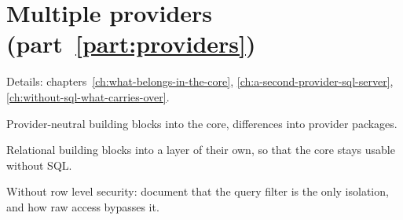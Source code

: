 \section{Multiple providers (part~\ref{part:providers})}

\noindent Details: chapters~\ref{ch:what-belongs-in-the-core}, \ref{ch:a-second-provider-sql-server}, \ref{ch:without-sql-what-carries-over}.

\begin{checklist}
  \item Provider-neutral building blocks into the core, differences into provider packages.
  \item Relational building blocks into a layer of their own, so that the core stays usable
    without SQL.
  \item Without row level security: document that the query filter is the only isolation,
    and how raw access bypasses it.
\end{checklist}
